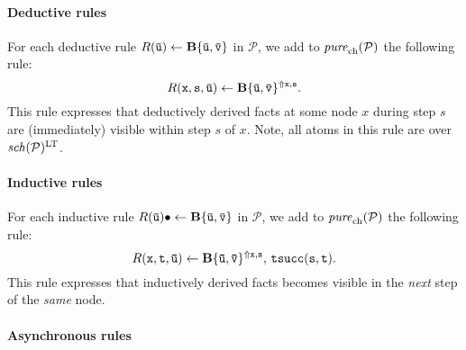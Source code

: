 \documentclass{tlp}
\newcommand{\ded}{\mathcal{P}}
\newcommand{\schof}[1]{\fname{sch}(#1)}
\newcommand{\var}[1]{\mathtt{#1}}
\newcommand{\tvar}[1]{\mathtt{\bar{#1}}}
\newcommand{\toloct}[1]{#1^{\mathrm{LT}}}
\newcommand{\addlt}[3]{#1^{\Uparrow#2,#3}}
\newcommand{\timesucc}{\pred{tsucc}}
\newcommand{\chosen}{\pred{chosen}}
\newcommand{\other}{\pred{other}}
\newcommand{\cand}{\pred{cand}}
\newcommand{\purech}[1]{\fname{pure}_{\mathrm{ch}}(#1)}
\begin{document}
\paragraph*{Deductive rules}

For each deductive rule $R(\tvar u)\gets\simplebody{\tvar u,\tvar v}$
in $\ded$, we add to $\purech{\ded}$ the following rule:
\begin{equation}
R(\var x,\var s,\tvar u)\gets\addlt{\simplebody{\tvar u,\tvar v}}{\var x}{\var s}.\label{eq:pure-duc}
\end{equation}
This rule expresses that deductively derived facts at some node $x$
during step $s$ are (immediately) visible within step $s$ of $x$.
Note, all atoms in this rule are over $\toloct{\schof{\ded}}$.


\paragraph*{Inductive rules}

For each inductive rule $R(\tvar u)\sugind\gets\simplebody{\tvar u,\tvar v}$
in $\ded$, we add to $\purech{\ded}$ the following rule: 
\begin{equation}
R(\var x,\var t,\tvar u)\gets\addlt{\simplebody{\tvar u,\tvar v}}{\var x}{\var s},\,\timesucc(\var s,\var t).\label{eq:pure-ind}
\end{equation}
This rule expresses that inductively derived facts becomes visible
in the \emph{next} step of the \emph{same} node.


\paragraph*{Asynchronous rules}

\newcommand{\rulechosen}[1]{\chosen_{R}(\var x,\var s,\var y,\var t,\tvar w)\gets\cand_{R}(\var x,\var s,\var y,\var t,\tvar w),\,\neg\other_{R}(\var x,\var s,\var y,\var t,\tvar w)#1}


\newcommand{\ruleother}[1]{\other_{R}(\var x,\var s,\var y,\var t,\tvar w)\gets\cand_{R}(\var x,\var s,\var y,\var t,\tvar w),\,\chosen_{R}(\var x,\var s,\var y,\var{t'},\tvar w),\,\var t\neq\var{t'}#1}


\newcommand{\ruledeliv}[1]{R(\var y,\var t,\tvar w)\gets\chosen_{R}(\var x,\var s,\var y,\var t,\tvar w)#1}
\end{document}
